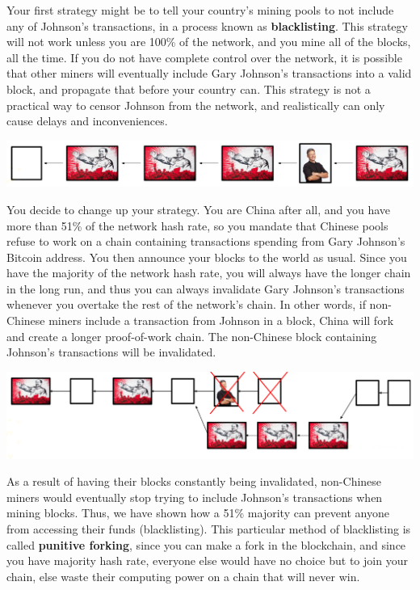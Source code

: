 \documentclass[full.tex]{subfiles}
\begin{document}
    Your first strategy might be to tell your country's mining pools to not include any of Johnson's transactions, in a process known as \textbf{blacklisting}. This strategy will not work unless you are 100\% of the network, and you mine all of the blocks, all the time. If you do not have complete control over the network, it is possible that other miners will eventually include Gary Johnson's transactions into a valid block, and propagate that before your country can. This strategy is not a practical way to censor Johnson from the network, and realistically can only cause delays and inconveniences.
    
    \begin{center}
        \includegraphics[scale=0.4]{blacklist_punitive}
    \end{center}
    
    You decide to change up your strategy. You are China after all, and you have more than 51\% of the network hash rate, so you mandate that Chinese pools refuse to work on a chain containing transactions spending from Gary Johnson's Bitcoin address. You then announce your blocks to the world as usual. Since you have the majority of the network hash rate, you will always have the longer chain in the long run, and thus you can always invalidate Gary Johnson's transactions whenever you overtake the rest of the network's chain. In other words, if non-Chinese miners include a transaction from Johnson in a block, China will fork and create a longer proof-of-work chain. The non-Chinese block containing Johnson's transactions will be invalidated. 
    
    \begin{center}
        \includegraphics[scale=0.4]{blacklist_punitive2}
    \end{center}
    
    As a result of having their blocks constantly being invalidated, non-Chinese miners would eventually stop trying to include Johnson's transactions when mining blocks. Thus, we have shown how a 51\% majority can prevent anyone from accessing their funds (blacklisting). This particular method of blacklisting is called \textbf{punitive forking}, since you can make a fork in the blockchain, and since you have majority hash rate, everyone else would have no choice but to join your chain, else waste their computing power on a chain that will never win.
    
\end{document}
